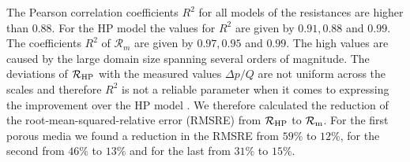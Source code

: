 \documentclass[draft]{agujournal2019}
\begin{document}
The Pearson correlation coefficients $R^2$ for all models of the resistances are higher than $0.88$. For the HP model the values for $R^2$ are given by $0.91, 0.88$ and $0.99$. The coefficients $R^2$ of $\mathcal{R}_m$ are given by $0.97, 0.95$ and $0.99$. The high values are caused by the large domain size spanning several orders of magnitude. The deviations of $\mathcal{R}_{\rm{HP}}$ with the measured values $\Delta p/Q$ are not uniform across the scales and  therefore $R^2$ is not a reliable parameter when it comes to expressing the improvement over the HP model \cite{wilcox_comparing_2009}. We therefore calculated the reduction of the root-mean-squared-relative error (RMSRE) from $\mathcal{R}_{\rm{HP}}$ to $\mathcal{R}_{\rm{m}}$. For the first porous media we found a reduction in the RMSRE from $59\%$ to $12\%$, for the second from $46\%$ to $13\%$ and for the last from $31\%$ to $15\%$.  
\end{document}
